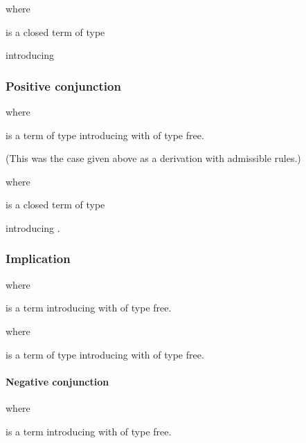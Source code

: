 \documentclass[acmtocl]{robtrans}\pdfoutput=1
\begin{document}
\smallskip
\quad 
where 

\quad
is a closed term of type 
 
introducing 

\subsubsection{Positive conjunction}














\smallskip
\quad 
where 

\quad
    is a term of type  introducing  with 
     of type  free.

\quad(This was the case given above as a derivation with admissible rules.)





\smallskip
\quad 
where 

\quad
is a closed term of type 

introducing .

\subsubsection{Implication}





\smallskip
\quad
where 

\quad
is a term introducing  
with  of type 
 free.





\smallskip
\quad
where 

\quad is a term of type  introducing  with
 of type  free.




\paragraph{Negative conjunction}









\smallskip
\quad
where 

\quad
is a term introducing  
with  of type 
 free.
\end{document}
